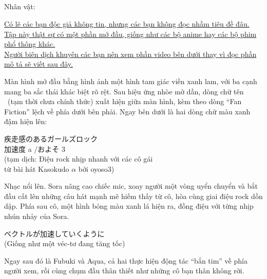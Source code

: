\documentclass[../main.tex]{subfiles}
\begin{document}
\subsection*{\label{ep-C2.I}}
\begin{center}
  {\caviar\fontsize{12pt}{12pt}\selectfont Nhân vật:             }
\end{center}

\begin{center}
  \uline{Có lẽ các bạn độc giả không tin, nhưng các bạn không đọc nhầm tiêu đề đâu. Tập này thật sự có một phần mở đầu, giống như các bộ anime hay các bộ phim phổ thông khác.\\Người biên dịch khuyên các bạn nên xem phần video bên dưới thay vì đọc phần mô tả sẽ viết sau đây.}

\end{center}

\il

Màn hình mở đầu bằng hình ảnh một hình tam giác viền xanh lam, với ba cạnh mang ba sắc thái khác biệt rõ rệt. Sau hiệu ứng nhòe mờ dần, dòng chữ tên \hll\ (tạm thời chưa chính thức) xuất hiện giữa màn hình, kèm theo dòng ``Fan Fiction'' lệch về phía dưới bên phải. Ngay bên dưới là hai dòng chữ màu xanh đậm hiện lên:

\begin{center}
  疾走感のあるガールズロック\\
  加速度 a /およそ 3\\
  (tạm dịch: Điệu rock nhịp nhanh với các cô gái\\
  từ bài hát Kasokudo $\alpha$ bởi oyoso3)
\end{center}

Nhạc nổi lên. Sora nâng cao chiếc mic, xoay người một vòng uyển chuyển và bắt đầu cất lên những câu hát mạnh mẽ hiếm thấy từ cô, hòa cùng giai điệu rock dồn dập. Phía sau cô, một hình bóng màu xanh lá hiện ra, đồng điệu với từng nhịp nhún nhảy của Sora.

\begin{center}
  ベクトルが加速していくように\\
  (Giống như một véc-tơ đang tăng tốc)
\end{center}

Ngay sau đó là Fubuki và Aqua, cả hai thực hiện động tác ``bắn tim'' về phía người xem, rồi cùng chụm đầu thân thiết như những cô bạn thân không rời.
\end{document}
